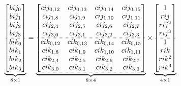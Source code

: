 \documentclass[12pt]{article}
\begin{document}
{\large
$$
\underbrace{\begin{bmatrix}
bij_0 \\
bij_1 \\
bij_2 \\
bij_3 \\
\hdashline
bik_0 \\
bik_1 \\
bik_2 \\
bik_3 \\
\end{bmatrix}}_{8\times 1}
=
\underbrace{\begin{bmatrix}
cij_{0,12} & cij_{0,13} & cij_{0,14} & cij_{0,15} \\
cij_{1,8 } & cij_{1,9 } & cij_{1,10} & cij_{1,11}\\
cij_{2,4 } & cij_{2,5 } & cij_{2,6 } & cij_{2,7 }\\
cij_{3,0 } & cij_{3,1 } & cij_{3,2 } & cij_{3,3 }\\
\hdashline
cik_{0,12} & cik_{0,13} & cik_{0,14} & cik_{0,15} \\
cik_{1,8 } & cik_{1,9 } & cik_{1,10} & cik_{1,11}\\
cik_{2,4 } & cik_{2,5 } & cik_{2,6 } & cik_{2,7 }\\
cik_{3,0 } & cik_{3,1 } & cik_{3,2 } & cik_{3,3 }\\
\hdashline
\end{bmatrix}}_{8\times 4}
\times
\underbrace{\begin{bmatrix}
1     \\
rij   \\
rij^2 \\
rij^3 \\
\hdashline
1     \\
rik   \\
rik^2 \\
rik^3 \\
\end{bmatrix}}_{4\times 1}
$$


}








\clearpage
\end{document}
